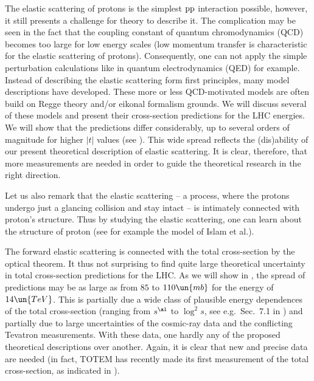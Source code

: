 \def\CaptionPrefix{I.}


The elastic scattering of protons is the simplest $\rm pp$ interaction possible, however, it still presents a challenge for theory to describe it. The complication may be seen in the fact that the coupling constant of quantum chromodynamics (QCD) becomes too large for low energy scales (low momentum transfer is characteristic for the elastic scattering of protons). Consequently, one can not apply the simple perturbation calculations like in quantum electrodynamics (QED) for example. Instead of describing the elastic scattering form first principles, many model descriptions have developed. These more or less QCD-motivated models are often build on Regge theory and/or eikonal formalism grounds. We will discuss several of these models and present their  cross-section predictions for the LHC energies. We will show that the predictions differ considerably, up to several orders of magnitude for higher $|t|$ values (see ). This wide spread reflects the (dis)ability of our present theoretical description of elastic scattering. It is clear, therefore, that more measurements are needed in order to guide the theoretical research in the right direction.

Let us also remark that the elastic scattering -- a process, where the protons undergo just a glancing collision and stay intact -- is intimately connected with proton's structure. Thus by studying the elastic scattering, one can learn about the structure of proton (see for example the model of Islam et al.).

The forward elastic scattering is connected with the total cross-section by the optical theorem. It thus not surprising to find quite large theoretical uncertainty in total cross-section predictions for the LHC. As we will show in , the spread of predictions may be as large as from $85$ to $110\un{mb}$ for the energy of $14\un{TeV}$. This is partially due a wide class of plausible energy dependences of the total cross-section (ranging from $s^{\al}$ to $\log^2 s$, see e.g.~Sec.~7.1 in ) and partially due to large uncertainties of the cosmic-ray data and the conflicting Tevatron measurements. With these data, one hardly any of the proposed theoretical descriptions over another. Again, it is clear that new and precise data are needed (in fact, TOTEM has recently made its first measurement of the total cross-section, as indicated in ).

